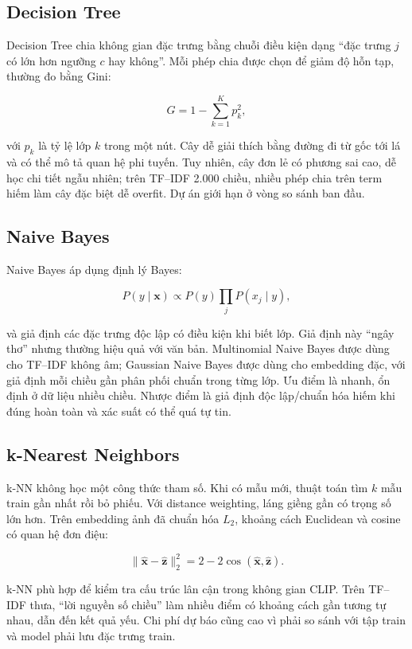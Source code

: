 \subsection{Decision Tree}

Decision Tree chia không gian đặc trưng bằng chuỗi điều kiện dạng
``đặc trưng \(j\) có lớn hơn ngưỡng \(c\) hay không''. Mỗi phép chia được chọn
để giảm độ hỗn tạp, thường đo bằng Gini:

\[
G=1-\sum_{k=1}^{K}p_k^2,
\]

với \(p_k\) là tỷ lệ lớp \(k\) trong một nút. Cây dễ giải thích bằng đường đi từ
gốc tới lá và có thể mô tả quan hệ phi tuyến. Tuy nhiên, cây đơn lẻ có phương
sai cao, dễ học chi tiết ngẫu nhiên; trên TF--IDF 2.000 chiều, nhiều phép chia
trên term hiếm làm cây đặc biệt dễ overfit. Dự án giới hạn
 ở vòng so sánh ban đầu.

\subsection{Naive Bayes}

Naive Bayes áp dụng định lý Bayes:

\[
P(y\mid\mathbf{x})\propto P(y)\prod_j P(x_j\mid y),
\]

và giả định các đặc trưng độc lập có điều kiện khi biết lớp. Giả định này
``ngây thơ'' nhưng thường hiệu quả với văn bản. Multinomial Naive Bayes được
dùng cho TF--IDF không âm; Gaussian Naive Bayes được dùng cho embedding đặc,
với giả định mỗi chiều gần phân phối chuẩn trong từng lớp. Ưu điểm là nhanh,
ổn định ở dữ liệu nhiều chiều. Nhược điểm là giả định độc lập/chuẩn hóa hiếm khi
đúng hoàn toàn và xác suất có thể quá tự tin.

\subsection{k-Nearest Neighbors}

k-NN không học một công thức tham số. Khi có mẫu mới, thuật toán tìm \(k\) mẫu
train gần nhất rồi bỏ phiếu. Với distance weighting, láng giềng gần có trọng số
lớn hơn. Trên embedding ảnh đã chuẩn hóa \(L_2\), khoảng cách Euclidean và cosine
có quan hệ đơn điệu:

\[
\lVert\hat{\mathbf{x}}-\hat{\mathbf{z}}\rVert_2^2
=2-2\cos(\hat{\mathbf{x}},\hat{\mathbf{z}}).
\]

k-NN phù hợp để kiểm tra cấu trúc lân cận trong không gian CLIP. Trên TF--IDF
thưa, ``lời nguyền số chiều'' làm nhiều điểm có khoảng cách gần tương tự nhau,
dẫn đến kết quả yếu. Chi phí dự báo cũng cao vì phải so sánh với tập train và
model phải lưu đặc trưng train.

